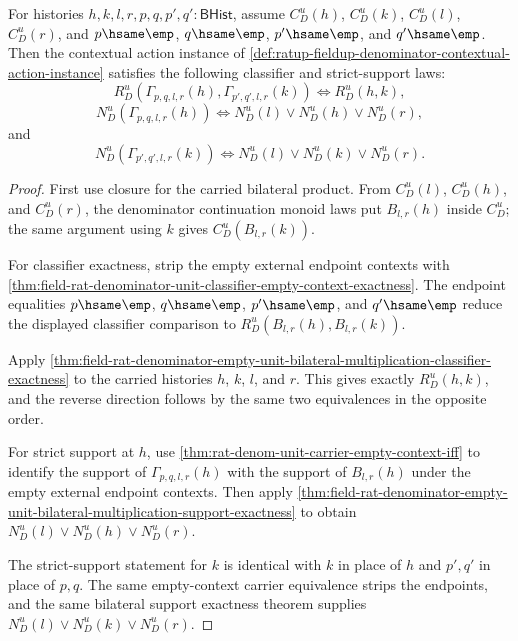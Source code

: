 \begin{theorem}
\label{thm:ratup-fieldup-denominator-contextual-action-certificate}
For histories $h,k,l,r,p,q,p',q':\mathsf{BHist}$, assume
$C_D^u(h)$, $C_D^u(k)$, $C_D^u(l)$, $C_D^u(r)$, and
$p\hsame\emp$, $q\hsame\emp$, $p'\hsame\emp$, and $q'\hsame\emp$. Then the
contextual action instance of
\autoref{def:ratup-fieldup-denominator-contextual-action-instance} satisfies
the following classifier and strict-support laws:
$$
R_D^u(\Gamma_{p,q,l,r}(h),\Gamma_{p',q',l,r}(k))
\Longleftrightarrow
R_D^u(h,k),
$$
$$
N_D^u(\Gamma_{p,q,l,r}(h))
\Longleftrightarrow
N_D^u(l)\lor N_D^u(h)\lor N_D^u(r),
$$
and
$$
N_D^u(\Gamma_{p',q',l,r}(k))
\Longleftrightarrow
N_D^u(l)\lor N_D^u(k)\lor N_D^u(r).
$$
\end{theorem}
\begin{proof}
First use closure for the carried bilateral product. From $C_D^u(l)$,
$C_D^u(h)$, and $C_D^u(r)$, the denominator continuation monoid laws put
$B_{l,r}(h)$ inside $C_D^u$; the same argument using $k$ gives
$C_D^u(B_{l,r}(k))$.

For classifier exactness, strip the empty external endpoint contexts with
\autoref{thm:field-rat-denominator-unit-classifier-empty-context-exactness}.
The endpoint equalities $p\hsame\emp$, $q\hsame\emp$, $p'\hsame\emp$, and
$q'\hsame\emp$ reduce the displayed classifier comparison to
$R_D^u(B_{l,r}(h),B_{l,r}(k))$.

Apply
\autoref{thm:field-rat-denominator-empty-unit-bilateral-multiplication-classifier-exactness}
to the carried histories $h$, $k$, $l$, and $r$. This gives exactly
$R_D^u(h,k)$, and the reverse direction follows by the same two equivalences in
the opposite order.

For strict support at $h$, use
\autoref{thm:rat-denom-unit-carrier-empty-context-iff} to identify the support
of $\Gamma_{p,q,l,r}(h)$ with the support of $B_{l,r}(h)$ under the empty
external endpoint contexts. Then apply
\autoref{thm:field-rat-denominator-empty-unit-bilateral-multiplication-support-exactness}
to obtain $N_D^u(l)\lor N_D^u(h)\lor N_D^u(r)$.

The strict-support statement for $k$ is identical with $k$ in place of $h$ and
$p',q'$ in place of $p,q$. The same empty-context carrier equivalence strips
the endpoints, and the same bilateral support exactness theorem supplies
$N_D^u(l)\lor N_D^u(k)\lor N_D^u(r)$.
\end{proof}


